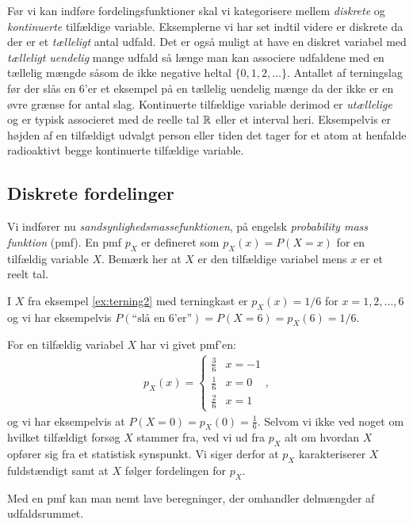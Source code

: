 Før vi kan indføre fordelingsfunktioner skal vi kategorisere mellem \emph{diskrete} og \emph{kontinuerte} tilfældige variable. Eksemplerne vi har set indtil videre er diskrete da der er et \emph{tælleligt} antal udfald. Det er også muligt at have en diskret variabel med \emph{tælleligt uendelig} mange udfald så længe man kan associere udfaldene med en tællelig mængde såsom de ikke negative heltal $\{0,1,2,\dots\}$. Antallet af terningslag før der slås en 6'er et eksempel på en tællelig uendelig mænge da der ikke er en øvre grænse for antal slag. Kontinuerte tilfældige variable derimod er \textit{utællelige} og er typisk associeret med de reelle tal $\mathbb{R}$ eller et interval heri. Eksempelvis er højden af en tilfældigt udvalgt person eller tiden det tager for et atom at henfalde radioaktivt begge kontinuerte tilfældige variable. 
\subsection{Diskrete fordelinger}
Vi indfører nu \emph{sandsynlighedsmassefunktionen}, på engelsk \textit{probability mass funktion} (pmf). En pmf $p_X$ er defineret som $p_X(x) = P(X = x)$ for en tilfældig variable $X$. Bemærk her at $X$ er den tilfældige variabel mens $x$ er et reelt tal.
\begin{example} \label{ex:terning3} I $X$ fra eksempel \ref{ex:terning2} med terningkast er $p_X(x) = 1/6$ for $x = 1,2,\dots, 6$ og vi har eksempelvis $P(\text{``slå en 6'er''}) = P(X = 6) = p_X(6) = 1/6$. 
\end{example}
\begin{example} \label{ex:terning4} For en tilfældig variabel $X$ har vi givet pmf'en:
\begin{align*}
p_X(x) = \begin{cases}
\frac{3}{6} & x = -1 \\
\frac{1}{6} & x = 0 \\ 
\frac{2}{6} & x = 1
\end{cases},
\end{align*}
og vi har eksempelvis at $P(X = 0) = p_X(0) = \frac{1}{6}$. Selvom vi ikke ved noget om hvilket tilfældigt forsøg $X$ stammer fra, ved vi ud fra $p_X$ alt om hvordan $X$ opfører sig fra et statistisk synspunkt. Vi siger derfor at $p_X$ karakteriserer $X$ fuldstændigt samt at $X$ følger fordelingen for $p_X$. 
\end{example}
Med en pmf kan man nemt lave beregninger, der omhandler delmængder af udfaldsrummet. 
